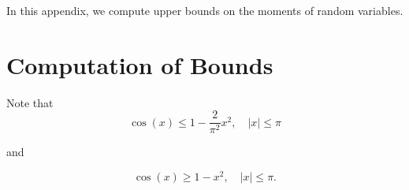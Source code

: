 In this appendix, we compute upper bounds on the moments of random
variables.

\section{Computation of Bounds}
Note that
\begin{equation}
\cos (x) \le 1 - \frac{2}{\pi^2} x^2, \quad |x| \le \pi
\end{equation}

\noindent and

\begin{equation}
\cos (x) \ge 1 -  x^2, \quad |x| \le \pi.
\end{equation}
